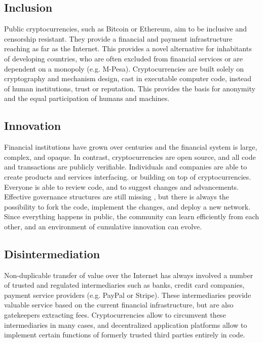 \subsection{Inclusion}

Public cryptocurrencies, such as Bitcoin or Ethereum, aim to be inclusive and censorship resistant. They provide a financial and payment infrastructure reaching as far as the Internet. This provides a novel alternative for inhabitants of developing countries, who are often excluded from financial services \parencite{chaia2010counting} or are dependent on a monopoly (e.g. M-Pesa). Cryptocurrencies are built solely on cryptography and mechanism design, cast in executable computer code, instead of human institutions, trust or reputation. This provides the basis for anonymity and the equal participation of humans and machines. 

\subsection{Innovation}

Financial institutions have grown over centuries and the financial system is large, complex, and opaque. In contrast, cryptocurrencies are open source, and all code and transactions are publicly verifiable. Individuals and companies are able to create products and services interfacing. or building on top of cryptocurrencies. Everyone is able to review code, and to suggest changes and advancements. Effective governance structures are still missing \parencite{Narayanan2015}, but there is always the possibility to fork the code, implement the changes, and deploy a new network. Since everything happens in public, the community can learn efficiently from each other, and an environment of cumulative innovation can evolve. 

\subsection{Disintermediation}

Non-duplicable transfer of value over the Internet has always involved a number of trusted and regulated intermediaries such as banks, credit card companies, payment service providers (e.g. PayPal or Stripe). These intermediaries provide valuable service based on the current financial infrastructure, but are also gatekeepers extracting fees. Cryptocurrencies allow to circumvent these intermediaries in many cases, and decentralized application platforms allow to implement certain functions of formerly trusted third parties entirely in code. 

